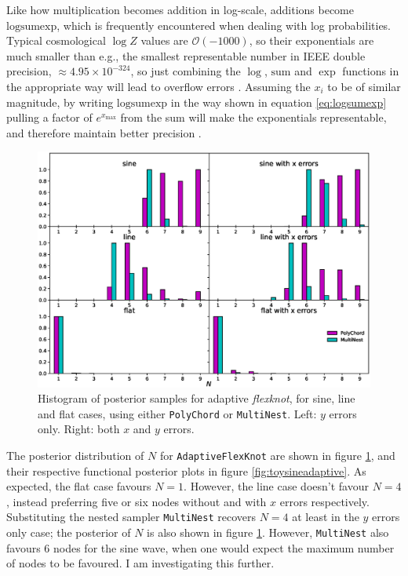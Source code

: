 \documentclass{article}
\begin{document}
Like how multiplication becomes addition in log-scale, additions become $\textrm{logsumexp}$, which is frequently encountered when dealing with log probabilities. Typical cosmological $\log Z$ values are $\mathcal{O}\left(-1000\right)$, so their exponentials are much smaller than e.g., the smallest representable number in IEEE double precision, $\approx4.95\times10^{-324}$, so just combining the $\log$, $\textrm{sum}$ and $\exp$ functions in the appropriate way will lead to overflow errors \cite{IEEE}. Assuming the $x_i$ to be of similar magnitude, by writing $\textrm{logsumexp}$ in the way shown in equation \ref{eq:logsumexp} pulling a factor of $e^{x_\textrm{max}}$ from the sum will make the exponentials representable, and therefore maintain better precision \cite{logsumexp}.

\begin{figure}[H]
  \centering
  \includegraphics[width=14cm]{toysineN.eps}
  \caption{Histogram of posterior samples for adaptive \textit{flexknot}, for sine, line and flat cases, using either \texttt{PolyChord} or \texttt{MultiNest}. Left: $y$ errors only. Right: both $x$ and $y$ errors.}
  \label{fig:toysineN}
\end{figure}

The posterior distribution of $N$ for \texttt{AdaptiveFlexKnot} are shown in figure \ref{fig:toysineN}, and their respective functional posterior plots in figure \ref{fig:toysineadaptive}. As expected, the flat case favours $N=1$. However, the line case doesn't favour $N=4$, instead preferring five or six nodes without and with $x$ errors respectively. Substituting the nested sampler \texttt{MultiNest} recovers $N=4$ at least in the $y$ errors only case; the posterior of $N$ is also shown in figure \ref{fig:toysineN}. However, \texttt{MultiNest} also favours 6 nodes for the sine wave, when one would expect the maximum number of nodes to be favoured. I am investigating this further. 
\end{document}
